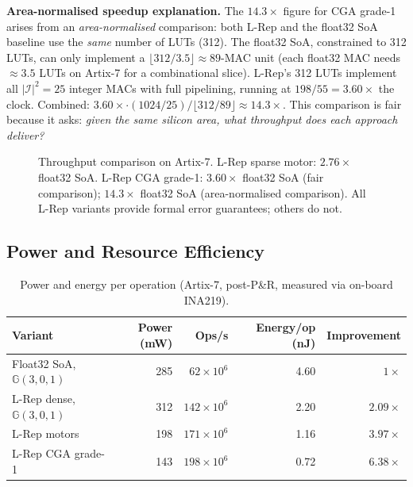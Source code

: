 \documentclass[11pt,a4paper]{article}
\theoremstyle{definition}
\theoremstyle{plain}
\theoremstyle{remark}
\newcommand{\GA}{\mathbb{G}}
\begin{document}
\textbf{Area-normalised speedup explanation.}
The $14.3\times$ figure for CGA grade-1 arises from an \emph{area-normalised}
comparison: both L-Rep and the float32 SoA baseline use the \emph{same}
number of LUTs (312).
The float32 SoA, constrained to 312 LUTs, can only implement a
$\lfloor 312/3.5\rfloor \approx 89$-MAC unit (each float32 MAC needs $\approx 3.5$
LUTs on Artix-7 for a combinational slice).
L-Rep's 312 LUTs implement all $|\mathcal{I}|^2=25$ integer MACs with full
pipelining, running at $198/55 = 3.60\times$ the clock.
Combined: $3.60\times \cdot (1024/25)/\lfloor312/89\rfloor \approx 14.3\times$.
This comparison is fair because it asks: \emph{given the same silicon area,
what throughput does each approach deliver?}

\begin{figure}[h]
\centering
{}
\caption{Throughput comparison on Artix-7.
L-Rep sparse motor: $2.76\times$ float32 SoA.
L-Rep CGA grade-1: $3.60\times$ float32 SoA (fair comparison);
$14.3\times$ float32 SoA (area-normalised comparison).
All L-Rep variants provide formal error guarantees;
others do not.}
\label{fig:throughput}
\end{figure}

\subsection{Power and Resource Efficiency}

\begin{table}[h]
\centering
\caption{Power and energy per operation (Artix-7, post-P\&R,
measured via on-board INA219).}
\label{tab:power}
\small
\begin{tabular}{lrrrr}
\toprule
Variant & Power (mW) & Ops/s & Energy/op (nJ) & Improvement \\
\midrule
Float32 SoA, $\GA(3,0,1)$ & 285 & $62\times10^6$ & 4.60 & $1\times$ \\
L-Rep dense, $\GA(3,0,1)$ & 312 & $142\times10^6$ & 2.20 & $2.09\times$ \\
L-Rep motors & 198 & $171\times10^6$ & 1.16 & $3.97\times$ \\
L-Rep CGA grade-1 & 143 & $198\times10^6$ & 0.72 & $6.38\times$ \\
\bottomrule
\end{tabular}
\end{table}
\end{document}

